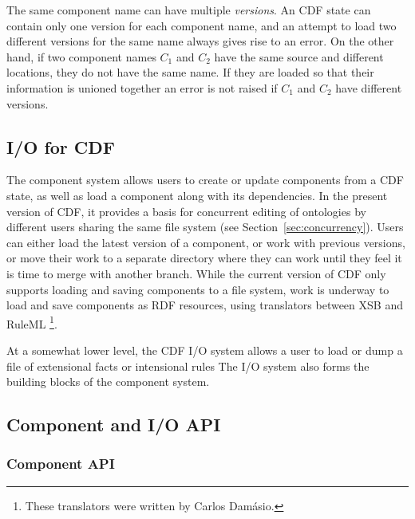 The same component name can have multiple {\em versions}.  An CDF
state can contain only one version for each component name, and an
attempt to load two different versions for the same name always gives
rise to an error.  On the other hand, if two component names $C_1$ and
$C_2$ have the same source and different locations, they do not have
the same name.  If they are loaded so that their information is
unioned together an error is not raised if $C_1$ and $C_2$ have
different versions.

\subsection{I/O for CDF}

The component system allows users to create or update components from
a CDF state, as well as load a component along with its dependencies.
In the present version of CDF, it provides a basis for concurrent
editing of ontologies by different users sharing the same file system
(see Section~\ref{sec:concurrency}).  Users can either load the latest
version of a component, or work with previous versions, or move their
work to a separate directory where they can work until they feel it is
time to merge with another branch.  While the current version of CDF
only supports loading and saving components to a file system, work is
underway to load and save components as RDF resources, using
translators between XSB and RuleML \cite{RuleML} \footnote{These
translators were written by Carlos Dam\'asio.}.

At a somewhat lower level, the CDF I/O system allows a user to load or
dump a file of extensional facts or intensional rules  The I/O system
also forms the building blocks of the component system.


\subsection{Component and I/O API}

\subsubsection{Component API}

